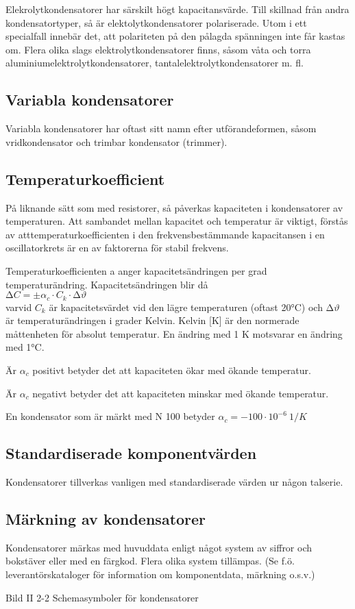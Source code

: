 Elekrolytkondensatorer har särskilt högt kapacitansvärde. Till skillnad från
andra kondensatortyper, så är elektolytkondensatorer polariserade. Utom i ett
specialfall innebär det, att polariteten på den pålagda spänningen inte får
kastas om. Flera olika slags elektrolytkondensatorer finns, såsom våta
och torra aluminiumelektrolytkondensatorer, tantalelektrolytkondensatorer m. fl.

\subsection{Variabla kondensatorer}
Variabla kondensatorer har oftast sitt namn efter utförandeformen, såsom
vridkondensator och trimbar kondensator (trimmer).

\subsection{Temperaturkoefficient}

På liknande sätt som med resistorer, så påverkas kapaciteten i kondensatorer av
temperaturen. Att sambandet mellan kapacitet och temperatur är viktigt, förstås
av atttemperaturkoefficienten i den frekvensbestämmande kapacitansen i en
oscillatorkrets är en av faktorerna för stabil frekvens.

Temperaturkoefficienten a anger kapacitetsändringen per grad temperaturändring.
Kapacitetsändringen blir då \\
\(∆C = \pm \alpha _c \cdot C_k \cdot ∆\vartheta\) \\
varvid \(C_k\) är kapacitetsvärdet vid den lägre temperaturen (oftast 20°C) och
\(∆\vartheta\) är temperaturändringen i grader Kelvin.
Kelvin [K] är den normerade måttenheten för absolut temperatur.
En ändring med 1 K motsvarar en ändring med 1°C.

Är \(\alpha _c\) positivt betyder det att kapaciteten ökar med ökande
temperatur.

Är \(\alpha _c\) negativt betyder det att kapaciteten minskar med ökande
temperatur.

En kondensator som är märkt med N 100 betyder
\(\alpha _c = -100 \cdot 10^{-6}\ 1/K\)

\subsection{Standardiserade komponentvärden}

Kondensatorer tillverkas vanligen med standardiserade värden ur någon talserie.

\subsection{Märkning av kondensatorer}

Kondensatorer märkas med huvuddata enligt något system av siffror och bokstäver
eller med en färgkod. Flera olika system tillämpas.
(Se f.ö. leverantörskataloger för information om komponentdata, märkning o.s.v.)

Bild II 2-2 Schemasymboler för kondensatorer
